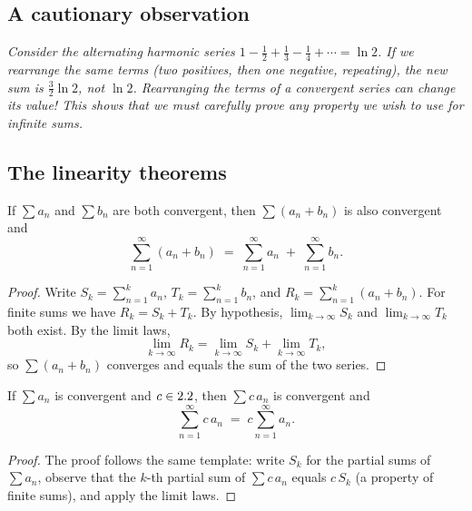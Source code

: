 \subsection*{A cautionary observation}

\textit{Consider the alternating harmonic series $1-\frac{1}{2}+\frac{1}{3}-\frac{1}{4}+\cdots = \ln 2$.  If we rearrange the same terms (two positives, then one negative, repeating), the new sum is $\frac{3}{2}\ln 2$, not $\ln 2$.  Rearranging the terms of a convergent series can change its value!  This shows that we must carefully \emph{prove} any property we wish to use for infinite sums.}

\subsection*{The linearity theorems}

\begin{theorem}
\label{thm:13-2}
If $\sum a_{n}$ and $\sum b_{n}$ are both convergent, then $\sum(a_{n}+b_{n})$ is also convergent and
\[
  \sum_{n=1}^{\infty}(a_{n}+b_{n}) \;=\; \sum_{n=1}^{\infty}a_{n} \;+\; \sum_{n=1}^{\infty}b_{n}.
\]
\end{theorem}

\begin{proof}
Write $S_{k}=\sum_{n=1}^{k}a_{n}$, $T_{k}=\sum_{n=1}^{k}b_{n}$, and $R_{k}=\sum_{n=1}^{k}(a_{n}+b_{n})$.  For finite sums we have $R_{k}=S_{k}+T_{k}$.  By hypothesis, $\lim_{k\to\infty}S_{k}$ and $\lim_{k\to\infty}T_{k}$ both exist.  By the limit laws,
\[
  \lim_{k\to\infty}R_{k} = \lim_{k\to\infty}S_{k}+\lim_{k\to\infty}T_{k},
\]
so $\sum(a_{n}+b_{n})$ converges and equals the sum of the two series.
\end{proof}

\begin{theorem}
\label{thm:13-3}
If $\sum a_{n}$ is convergent and $c\in2.2$, then $\sum c\,a_{n}$ is convergent and
\[
  \sum_{n=1}^{\infty}c\,a_{n} \;=\; c\sum_{n=1}^{\infty}a_{n}.
\]
\end{theorem}

\begin{proof}
The proof follows the same template: write $S_{k}$ for the partial sums of $\sum a_{n}$, observe that the $k$-th partial sum of $\sum c\,a_{n}$ equals $c\,S_{k}$ (a property of finite sums), and apply the limit laws.
\end{proof}

